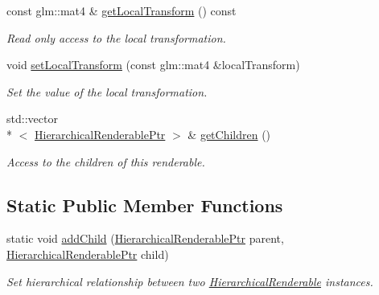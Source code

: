 \begin{DoxyCompactItemize}
const glm\+::mat4 \& \hyperlink{classHierarchicalRenderable_a201ce5c2ec7f323e6f3d0224a1eb31ef}{get\+Local\+Transform} () const 
\begin{DoxyCompactList}\small\item\em Read only access to the local transformation. \end{DoxyCompactList}\item 
void \hyperlink{classHierarchicalRenderable_a6dc43305b230675bd308566746aa1539}{set\+Local\+Transform} (const glm\+::mat4 \&local\+Transform)
\begin{DoxyCompactList}\small\item\em Set the value of the local transformation. \end{DoxyCompactList}\item 
std\+::vector\\*
$<$ \hyperlink{HierarchicalRenderable_8hpp_a9de1dda7f7ef0bca09b721bdb133964a}{Hierarchical\+Renderable\+Ptr} $>$ \& \hyperlink{classHierarchicalRenderable_a8a9b40b55e05760d76e39c8045bc9c71}{get\+Children} ()
\begin{DoxyCompactList}\small\item\em Access to the children of this renderable. \end{DoxyCompactList}\end{DoxyCompactItemize}
\subsection*{Static Public Member Functions}
\begin{DoxyCompactItemize}
\item 
static void \hyperlink{classHierarchicalRenderable_a0a8014f41a0439e86b18a78e8fbc448b}{add\+Child} (\hyperlink{HierarchicalRenderable_8hpp_a9de1dda7f7ef0bca09b721bdb133964a}{Hierarchical\+Renderable\+Ptr} parent, \hyperlink{HierarchicalRenderable_8hpp_a9de1dda7f7ef0bca09b721bdb133964a}{Hierarchical\+Renderable\+Ptr} child)
\begin{DoxyCompactList}\small\item\em Set hierarchical relationship between two \hyperlink{classHierarchicalRenderable}{Hierarchical\+Renderable} instances. \end{DoxyCompactList}\end{DoxyCompactItemize}
